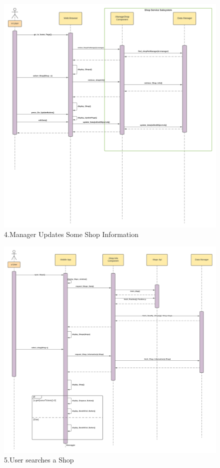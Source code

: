 \begin{figure}[h!]
    \centering
    \includegraphics[width=1\textwidth]{Images/runtimeViewDD/updateshopruntime.png}
    \caption{\label{fig:RunTimeViewUpdateShopEnqueue}{4.Manager Updates Some Shop Information}}
\end{figure}

\begin{figure}[h!]
    \centering
    \includegraphics[width=1\textwidth]{Images/runtimeViewDD/RunTimeViewUserSearchAShop.png}
    \caption{\label{fig:RunTimeViewSearchesAShop}{5.User searches a Shop}}
\end{figure}

